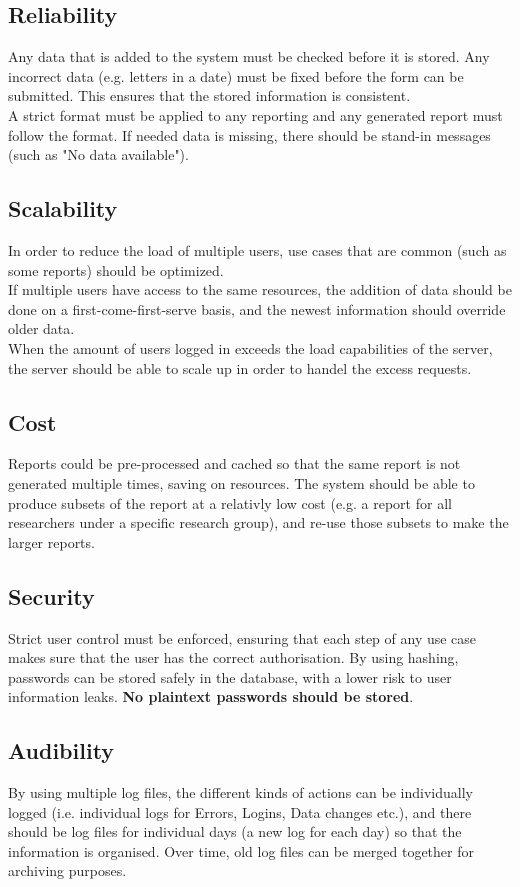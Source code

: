 \documentclass{article}
\begin{document}
		\subsection{Reliability}
			Any data that is added to the system must be checked before it is stored. Any incorrect data (e.g. letters in a date) must be fixed before the form can be submitted. This ensures that the stored information is consistent.\\
			
			A strict format must be applied to any reporting and any generated report must follow the format. If needed data is missing, there should be stand-in messages (such as "No data available").
		\subsection{Scalability}
			In order to reduce the load of multiple users, use cases that are common (such as some reports) should be optimized.\\
			
			If multiple users have access to the same resources, the addition of data should be done on a first-come-first-serve basis, and the newest information should override older data.\\
			
			When the amount of users logged in exceeds the load capabilities of the server, the server should be able to scale up in order to handel the excess requests.
		\subsection{Cost}
			Reports could be pre-processed and cached so that the same report is not generated multiple times, saving on resources. The system should be able to produce subsets of the report at a relativly low cost (e.g. a report for all researchers under a specific research group), and re-use those subsets to make the larger reports.
		\subsection{Security}
			Strict user control must be enforced, ensuring that each step of any use case makes sure that the user has the correct authorisation. By using hashing, passwords can be stored safely in the database, with a lower risk to user information leaks. \textbf{No plaintext passwords should be stored}.
		\subsection{Audibility}
			By using multiple log files, the different kinds of actions can be individually logged (i.e. individual logs for Errors, Logins, Data changes etc.), and there should be log files for individual days (a new log for each day) so that the information is organised. Over time, old log files can be merged together for archiving purposes.
\end{document}
